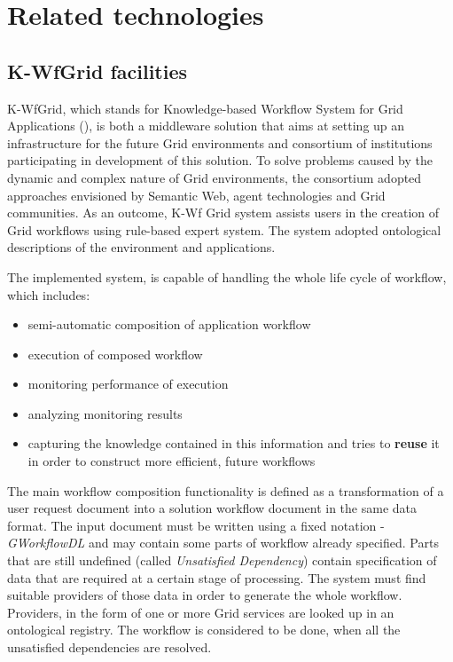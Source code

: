 
\section{Related technologies} 

\subsection{K-WfGrid facilities}

\label{ssec:kwfgrid}

K-WfGrid, which stands for Knowledge-based Workflow System for Grid Applications (\cite{KWfGrid1, flow-cgw04, wct-kwf-book-07}), is both a middleware solution that aims at setting up an infrastructure for the future Grid environments and consortium of institutions participating in development of this solution. To solve problems caused by the dynamic and complex nature of Grid environments, the consortium adopted approaches envisioned by Semantic Web, agent technologies and Grid communities. As an outcome, K-Wf Grid system assists users in the creation of Grid workflows using rule-based expert system. The system adopted ontological descriptions of the environment and applications.

The implemented system, is capable of handling the whole life cycle of workflow, which includes:

\begin{itemize}

\item{semi-automatic composition of application workflow} \item{execution of composed workflow} \item{monitoring performance of execution} \item{analyzing monitoring results} \item{capturing the knowledge contained in this information and tries to {\bf reuse} it in order to construct more efficient, future workflows} \end{itemize}

The main workflow composition functionality is defined as a transformation of a user request document into a solution workflow document in the same data format. The input document must be written using a fixed notation - \emph{GWorkflowDL} and may contain some parts of workflow already specified. Parts that are still undefined (called \emph{Unsatisfied Dependency}) contain specification of data that are required at a certain stage of processing. The system must find suitable providers of those data in order to generate the whole workflow. Providers, in the form of one or more Grid services are looked up in an ontological registry. The workflow is considered to be done, when all the unsatisfied dependencies are resolved.

